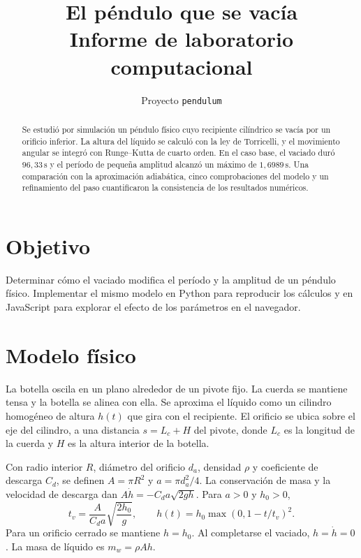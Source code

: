 \documentclass[11pt,a4paper]{article}
\title{El péndulo que se vacía\\[0.4em]\large Informe de laboratorio computacional}
\author{Proyecto \texttt{pendulum}}
\date{}
\begin{document}
\maketitle

\begin{abstract}
Se estudió por simulación un péndulo físico cuyo recipiente cilíndrico se
vacía por un orificio inferior. La altura del líquido se calculó con la ley
de Torricelli, y el movimiento angular se integró con Runge--Kutta de
cuarto orden. En el caso base, el vaciado duró \(96{,}33\,\mathrm{s}\) y el
período de pequeña amplitud alcanzó un máximo de \(1{,}6989\,\mathrm{s}\).
Una comparación con la aproximación adiabática, cinco comprobaciones del
modelo y un refinamiento del paso cuantificaron la consistencia de los
resultados numéricos.
\end{abstract}

\section{Objetivo}
Determinar cómo el vaciado modifica el período y la amplitud de un péndulo
físico. Implementar el mismo modelo en Python para reproducir los cálculos
y en JavaScript para explorar el efecto de los parámetros en el navegador.

\section{Modelo físico}
La botella oscila en un plano alrededor de un pivote fijo. La cuerda se
mantiene tensa y la botella se alinea con ella. Se aproxima el líquido
como un cilindro homogéneo de altura \(h(t)\) que gira con el recipiente.
El orificio se ubica sobre el eje del cilindro, a una distancia
\(s=L_c+H\) del pivote, donde \(L_c\) es la longitud de la cuerda y \(H\)
es la altura interior de la botella.

Con radio interior \(R\), diámetro del orificio \(d_a\), densidad \(\rho\)
y coeficiente de descarga \(C_d\), se definen \(A=\pi R^2\) y
\(a=\pi d_a^2/4\). La conservación de masa y la velocidad de descarga
dan \(A\dot h=-C_d a\sqrt{2gh}\). Para \(a>0\) y \(h_0>0\),
\[
 t_v=\frac{A}{C_da}\sqrt{\frac{2h_0}{g}},\qquad
 h(t)=h_0\max(0,1-t/t_v)^2.
\]
Para un orificio cerrado se mantiene \(h=h_0\). Al completarse el vaciado,
\(h=\dot h=0\). La masa de líquido es \(m_w=\rho Ah\).
\end{document}
